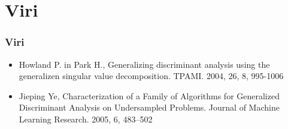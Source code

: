 \documentclass{beamer}
\begin{document}
\section{Viri}

\begin{frame}
\frametitle{Viri}
\begin{itemize}
\item Howland P. in Park H., Generalizing discriminant analysis using the generalizen singular value decomposition. TPAMI. 2004, 26, 8, 995-1006
\item Jieping Ye, Characterization of a Family of Algorithms for Generalized Discriminant Analysis on Undersampled Problems. Journal of Machine Learning Research. 2005, 6, 483–502
\end{itemize}
\end{frame}
\end{document}
